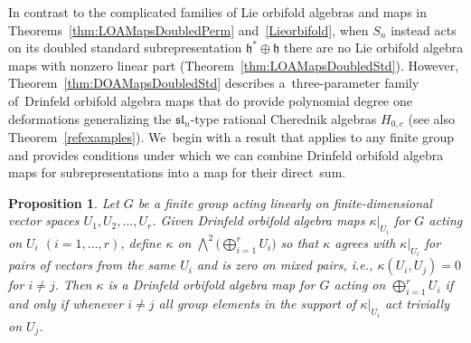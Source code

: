\documentclass[10pt,a4paper]{amsart}
\numberwithin{equation}{section}
\newtheorem{Proposition}[Theorem]{Proposition}
 { \theoremstyle{definition}
\newtheorem{Definition}[Theorem]{Definition}
\newtheorem{Remark}[Theorem]{Remark}
\newtheorem{case}{Case}}
\begin{document}
In contrast to the complicated families of Lie orbifold algebras and
maps in Theorems~\ref{thm:LOAMapsDoubledPerm} and~\ref{Lieorbifold},
when $S_n$ instead acts on its doubled standard subrepresentation
$\mathfrak{h}^*\oplus\mathfrak{h}$ there are no Lie orbifold algebra maps with nonzero linear
part (Theorem~\ref{thm:LOAMapsDoubledStd}).
However, Theorem~\ref{thm:DOAMapsDoubledStd} describes a~three-parameter
family of~Drinfeld orbifold algebra maps that do provide polynomial degree
one deformations generalizing the $\mathfrak{sl}_n$-type rational Cherednik
algebras $H_{0,c}$ (see also Theorem~\ref{refexamples}). We~begin with a result that applies to any finite group and
provides conditions under which we can combine Drinfeld orbifold algebra maps for subrepresentations into a map for their direct~sum.

\begin{Proposition}	\label{prop:directsum}
Let $G$ be a finite group acting linearly on finite-dimensional vector spaces $U_1, U_2,\ldots,U_r$.
Given Drinfeld orbifold algebra maps $\kappa|_{U_i}$ for $G$ acting on $U_i$ $(i=1,\ldots,r)$, define $\kappa$ on $\bigwedge^2 \big(\bigoplus_{i=1}^r U_i\big)$ so that $\kappa$ agrees with $\kappa|_{U_i}$ for pairs of vectors from the same $U_i$ and is zero on mixed pairs, i.e., $\kappa(U_i,U_j)=0$ for $i\neq j$. Then $\kappa$ is a Drinfeld orbifold algebra map for $G$ acting on $\bigoplus_{i=1}^r U_i$ if and only if whenever $i\neq j$ all group elements in the support of $\kappa|_{U_i}$ act trivially on $U_j$.
\end{Proposition}
\end{document}
